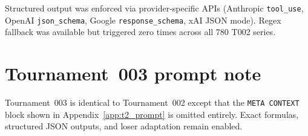 \documentclass[11pt]{article}
\newcommand{\tTwo}{T002}
\begin{document}
\noindent Structured output was enforced via provider-specific APIs (Anthropic \texttt{tool\_use}, OpenAI \texttt{json\_schema}, Google \texttt{response\_schema}, xAI JSON mode).
Regex fallback was available but triggered zero times across all 780 \tTwo{} series.

\section{Tournament~003 prompt note}\label{app:t3_prompt}

Tournament~003 is identical to Tournament~002 except that the \texttt{META CONTEXT} block shown in Appendix~\ref{app:t2_prompt} is omitted entirely.
Exact formulas, structured JSON outputs, and loser adaptation remain enabled.
\end{document}
